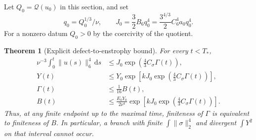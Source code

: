 \documentclass[11pt,a4paper]{article}
\newtheorem{theorem}{Theorem}[section]
\theoremstyle{definition}\newtheorem{definition}[theorem]{Definition}
\theoremstyle{remark}\newtheorem{remark}[theorem]{Remark}
\newcommand{\Q}{\mathcal Q}
\newcommand{\dd}{\,\mathrm d}
\newcommand{\norm}[1]{\lVert #1\rVert}
\newcommand{\Csg}{C_\sigma}
\numberwithin{equation}{section}
\begin{document}
Let $Q_0=\Q(u_0)$ in this section, and set
\begin{equation}\label{eq:J0}
 q_0=Q_0^{1/3}/\nu,\qquad
 J_0=\frac32 B_6q_0^4
 =\frac{3^{4/3}}2 C_6^4a_0q_0^4.
\end{equation}
For a nonzero datum $Q_0>0$ by the coercivity of the quotient.

\begin{theorem}[Explicit defect-to-enstrophy bound]\label{thm:defectbridge}
For every $t<T_*$,
\begin{align}
 \nu^{-3}\int_0^t\norm{u(s)}_6^4\dd s
 &\le J_0\exp\left(\tfrac43\Csg \Gamma(t)\right),\label{eq:defectSerrin}\\
 Y(t)&\le Y_0\exp\left[kJ_0\exp\left(\tfrac43\Csg \Gamma(t)\right)\right],
 \label{eq:defectY}\\
 \Gamma(t)&\le\tfrac1{16}B(t),\label{eq:defectlower}\\
 B(t)&\le\frac{E_0Y_0}{2\nu^4}
   \exp\left[kJ_0\exp\left(\tfrac43\Csg \Gamma(t)\right)\right].
 \label{eq:defectB}
\end{align}
Thus, at any finite endpoint up to the maximal time, finiteness of $\Gamma$ is equivalent to finiteness of $B$. In particular, a branch with finite $\int\norm\sigma_2^4$ and divergent $\int Y^2$ on that interval cannot occur.
\end{theorem}
\end{document}
